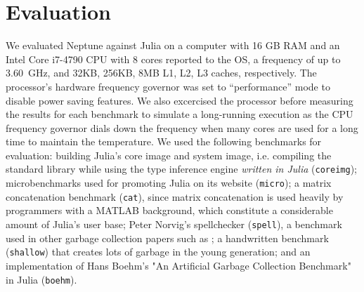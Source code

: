 \section{Evaluation} \label{evaluation}

We evaluated Neptune against Julia on a computer with 16 GB RAM and an Intel Core i7-4790 CPU with 8 cores reported to the OS, a frequency of up to $3.60$~GHz, and 32KB, 256KB, 8MB L1, L2, L3 caches, respectively.
The processor's hardware frequency governor was set to ``performance'' mode to disable power saving features.
We also excercised the processor before measuring the results for each benchmark to simulate a long-running execution as the CPU frequency governor dials down the frequency when many cores are used for a long time to maintain the temperature.
We used the following benchmarks for evaluation: building Julia's core image and system image, i.e. compiling the standard library while using the type inference engine \emph{written in Julia} (\texttt{coreimg}); microbenchmarks used for promoting Julia on its website (\texttt{micro}); a matrix concatenation benchmark (\texttt{cat}), since matrix concatenation is used heavily by programmers with a MATLAB background, which constitute a considerable amount of Julia's user base; Peter Norvig's spellchecker (\texttt{spell}), a benchmark used in other garbage collection papers such as \cite{marlow2008parallel}; a handwritten benchmark (\texttt{shallow}) that creates lots of garbage in the young generation; and an implementation of Hans Boehm's "An Artificial Garbage Collection Benchmark" in Julia (\texttt{boehm}).

